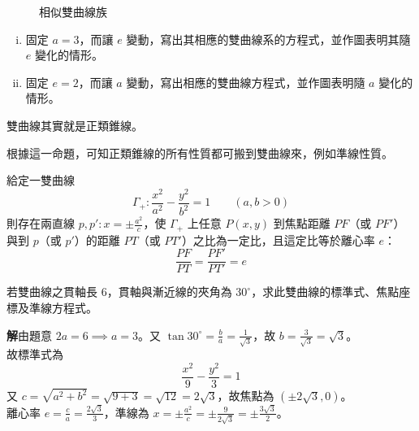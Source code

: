 \begin{figure}[htbp]
\centering
{}
\caption{相似雙曲線族}
\label{fig:b4s-3-16}
\end{figure}

\begin{exercise}
\begin{enumerate}[(i)]
  \item 固定 $a=3$，而讓 $e$ 變動，寫出其相應的雙曲線系的方程式，並作圖表明其隨 $e$ 變化的情形。
  \item 固定 $e=2$，而讓 $a$ 變動，寫出相應的雙曲線方程式，並作圖表明隨 $a$ 變化的情形。
\end{enumerate}
\end{exercise}

\begin{proposition}
雙曲線其實就是正類錐線。
\end{proposition}

根據這一命題，可知正類錐線的所有性質都可搬到雙曲線來，例如準線性質。

\begin{theorem}
給定一雙曲線
\[ \Gamma_+ : \frac{x^2}{a^2} - \frac{y^2}{b^2} = 1 \qquad (a, b > 0) \]
則存在兩直線 $p, p' : x = \pm \frac{a^2}{c}$，使 $\Gamma_+$ 上任意 $P(x,y)$ 到焦點距離 $PF$（或 $PF'$）與到 $p$（或 $p'$）的距離 $PT$（或 $PT'$）之比為一定比，且這定比等於離心率 $e$：
\begin{equation}
\frac{PF}{PT} = \frac{PF'}{PT'} = e \label{eq:b4s-3-2-4}
\end{equation}
\end{theorem}

\begin{example}
若雙曲線之貫軸長 6，貫軸與漸近線的夾角為 $30^\circ$，求此雙曲線的標準式、焦點座標及準線方程式。

\textbf{解}\quad 由題意 $2a = 6 \implies a = 3$。又 $\tan 30^\circ = \frac{b}{a} = \frac{1}{\sqrt{3}}$，故 $b = \frac{3}{\sqrt{3}} = \sqrt{3}$。\\
故標準式為
\[ \frac{x^2}{9} - \frac{y^2}{3} = 1 \]
又 $c = \sqrt{a^2 + b^2} = \sqrt{9 + 3} = \sqrt{12} = 2\sqrt{3}$，故焦點為 $(\pm 2\sqrt{3}, 0)$。\\
離心率 $e = \frac{c}{a} = \frac{2\sqrt{3}}{3}$，準線為 $x = \pm \frac{a^2}{c} = \pm \frac{9}{2\sqrt{3}} = \pm \frac{3\sqrt{3}}{2}$。
\end{example}

